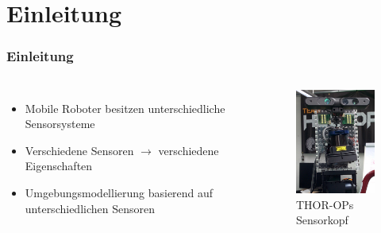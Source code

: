 \section{Einleitung}

\begin{frame}[t]
    \frametitle{Einleitung}
    
      \begin{columns}[t]
      \column[]{7cm}
      
      \begin{itemize}
      \item Mobile Roboter besitzen unterschiedliche Sensorsysteme
      \item Verschiedene Sensoren $\rightarrow$ verschiedene Eigenschaften
      \item Umgebungsmodellierung basierend auf unterschiedlichen Sensoren
      \end{itemize}
     

      \column{5cm}
      
      \begin{figure}[h]
	\centering
	    \includegraphics[width=3.5cm]{images/kopf}
	\caption{THOR-OPs Sensorkopf} 
      \end{figure}
  
    \end{columns}


\end{frame}


